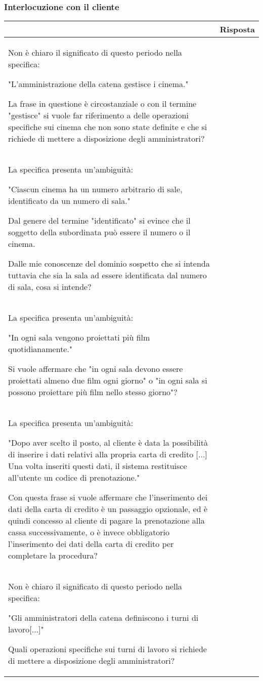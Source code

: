 \pagebreak
\subsubsection*{Interlocuzione con il cliente}

\begin{tabularx}{\linewidth}{|X|X|}
    \hline
    \rowcolor{tblhdrcolor}
    \multicolumn{1}{|c|}{\textbf{Messaggio}}
     & \multicolumn{1}{|c|}{\textbf{Risposta}}
    \\\hline
    Non è chiaro il significato di questo periodo nella specifica:

    "L'amministrazione della catena gestisce i cinema."

    La frase in questione è circostanziale o con il termine "gestisce" si vuole
    far riferimento a delle operazioni specifiche sui cinema che non sono state
    definite e che si richiede di mettere a disposizione degli amministratori?
     & \hfill
    \\\hline
    La specifica presenta un'ambiguità:

    "Ciascun cinema ha un numero arbitrario di sale,
    identificato da un numero di sala."

    Dal genere del termine "identificato" si evince che il soggetto della
    subordinata può essere il numero o il cinema.

    Dalle mie conoscenze del dominio sospetto che si intenda tuttavia
    che sia la sala ad essere identificata dal numero di sala,
    cosa si intende?
     & \hfill
    \\\hline
    La specifica presenta un'ambiguità:

    "In ogni sala vengono proiettati più film quotidianamente."

    Si vuole affermare che
    "in ogni sala devono essere proiettati almeno due film ogni giorno"
    o
    "in ogni sala si possono proiettare più film nello stesso giorno"?
     & \hfill
    \\\hline
    La specifica presenta un'ambiguità:

    "Dopo aver scelto il posto, al cliente è data la possibilità di inserire
    i dati relativi alla propria carta di credito [...] Una volta inseriti
    questi dati, il sistema restituisce all’utente un codice di prenotazione."

    Con questa frase si vuole affermare che l'inserimento dei dati della carta
    di credito è un passaggio opzionale, ed è quindi concesso al cliente
    di pagare la prenotazione alla cassa successivamente,
    o è invece obbligatorio l'inserimento dei dati della carta di credito per
    completare la procedura?
     & \hfill
    \\\hline
    Non è chiaro il significato di questo periodo nella specifica:

    "Gli amministratori della catena definiscono i turni di lavoro[...]"

    Quali operazioni specifiche sui turni di lavoro si richiede di mettere
    a disposizione degli amministratori?
     & \hfill
    \\\hline
\end{tabularx}

